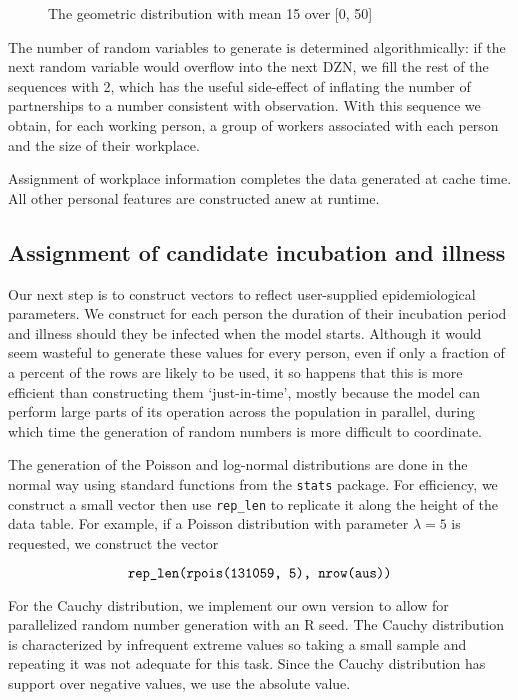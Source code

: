 \documentclass{grattan}
\newcommand*{\code}[1]{\texttt{#1}}
\begin{document}
\begin{figure}[!htbp]
\caption{The geometric distribution with mean 15 over [0, 50]}\label{fig:geom-distr}
\par
	
\end{figure}

The number of random variables to generate is determined algorithmically: if the next random variable
would overflow into the next DZN, we fill the rest of the sequences with 2, which has the useful 
side-effect of inflating the number of partnerships to a number consistent with observation.
With this sequence we obtain, for each working person, a group of workers associated with each person 
and the size of their workplace.

Assignment of workplace information completes the data generated at cache time. All other personal
features are constructed anew at runtime. 

\subsection{Assignment of candidate incubation and illness }

Our next step is to construct vectors to reflect user-supplied epidemiological parameters.
We construct for each person the duration of their incubation period and illness should they
be infected when the model starts. Although it would seem wasteful to generate these values
for every person, even if only a fraction of a percent of the rows are likely to be used, it 
so happens that this is more efficient than constructing them `just-in-time', mostly because
the model can perform large parts of its operation across the population in parallel, during 
which time the generation of random numbers is more difficult to coordinate.

The generation of the Poisson and log-normal distributions are done in the normal way using
 standard functions from the \code{stats} package.  For efficiency, we construct a small vector
 then use \code{rep\_len} to replicate it along the height of the data table. For example, if
 a Poisson distribution with parameter \(\lambda = 5\) is requested, we construct the vector

\[\text{\code{rep\_len(rpois(131059, 5), nrow(aus))}} \]

 For the Cauchy distribution, we implement our own version to allow for parallelized random
 number generation with an R seed. The Cauchy distribution is characterized by infrequent 
 extreme values so taking a small sample and repeating it was not adequate for this task.
 Since the Cauchy distribution has support over negative values,
 we use the absolute value.
\end{document}
